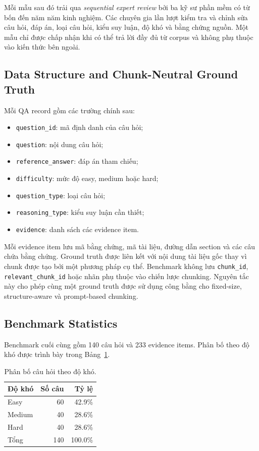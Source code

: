 Mỗi mẫu sau đó trải qua \textit{sequential expert review} bởi ba kỹ sư phần mềm có từ bốn đến năm năm kinh nghiệm. Các chuyên gia lần lượt kiểm tra và chỉnh sửa câu hỏi, đáp án, loại câu hỏi, kiểu suy luận, độ khó và bằng chứng nguồn. Một mẫu chỉ được chấp nhận khi có thể trả lời đầy đủ từ corpus và không phụ thuộc vào kiến thức bên ngoài.

\subsection{Data Structure and Chunk-Neutral Ground Truth}

Mỗi QA record gồm các trường chính sau:

\begin{itemize}
    \item \texttt{question\_id}: mã định danh của câu hỏi;
    \item \texttt{question}: nội dung câu hỏi;
    \item \texttt{reference\_answer}: đáp án tham chiếu;
    \item \texttt{difficulty}: mức độ easy, medium hoặc hard;
    \item \texttt{question\_type}: loại câu hỏi;
    \item \texttt{reasoning\_type}: kiểu suy luận cần thiết;
    \item \texttt{evidence}: danh sách các evidence item.
\end{itemize}

Mỗi evidence item lưu mã bằng chứng, mã tài liệu, đường dẫn section và các câu chứa bằng chứng. Ground truth được liên kết với nội dung tài liệu gốc thay vì chunk được tạo bởi một phương pháp cụ thể. Benchmark không lưu \texttt{chunk\_id}, \texttt{relevant\_chunk\_id} hoặc nhãn phụ thuộc vào chiến lược chunking. Nguyên tắc này cho phép cùng một ground truth được sử dụng công bằng cho fixed-size, structure-aware và prompt-based chunking.

\subsection{Benchmark Statistics}

Benchmark cuối cùng gồm 140 câu hỏi và 233 evidence items. Phân bố theo độ khó được trình bày trong Bảng~\ref{tab:difficulty-distribution}.

\begin{table}[t]
\centering
\small
\begin{tabular}{lrr}
\toprule
\textbf{Độ khó} & \textbf{Số câu} & \textbf{Tỷ lệ} \\
\midrule
Easy   & 60  & 42.9\% \\
Medium & 40  & 28.6\% \\
Hard   & 40  & 28.6\% \\
\midrule
Tổng   & 140 & 100.0\% \\
\bottomrule
\end{tabular}
\caption{Phân bố câu hỏi theo độ khó.}
\label{tab:difficulty-distribution}
\end{table}

